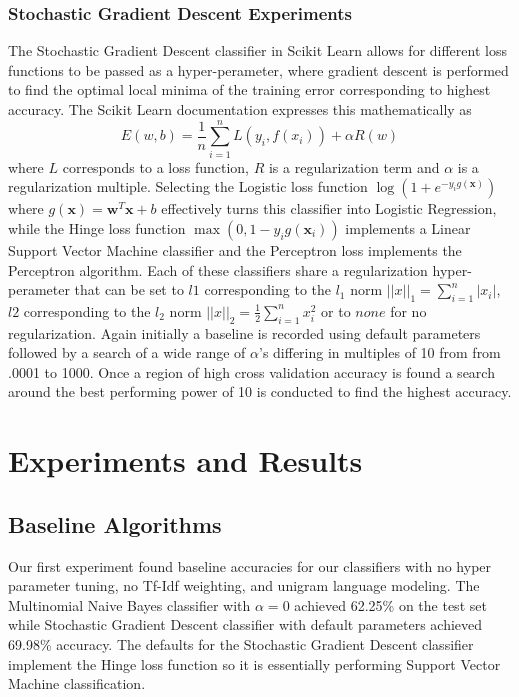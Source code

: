 \documentclass[a4paper, 12pt]{article}
\begin{document}
\subsubsection{Stochastic Gradient Descent Experiments}
The Stochastic Gradient Descent classifier in Scikit Learn allows for different loss functions to be passed as a hyper-perameter, where gradient descent is performed to find the optimal local minima of the training error corresponding to highest accuracy. The Scikit Learn documentation \cite{pedregosa2011scikit} expresses this mathematically as 
\[E(w,b)=\frac{1}{n}\sum_{i=1}^{n}L(y_i,f(x_i))+\alpha R(w)\]
where $L$ corresponds to a loss function, $R$ is a regularization term and $\alpha$ is a regularization multiple. Selecting the Logistic loss function $\log(1+e^{-y_ig(\bm{x})})$ where $g(\bm{x})=\bm{w}^T\bm{x}+b$ effectively turns this classifier into Logistic Regression, while the Hinge loss function  $\max(0, 1 - y_ig(\bm{x}_i))$ implements a Linear Support Vector Machine classifier and the Perceptron loss implements the Perceptron algorithm.  Each of these classifiers share a regularization hyper-perameter that can be set to $l1$ corresponding to the $l_1$ norm $||x||_1=\sum_{i=1}^n |x_i|$, $l2$ corresponding to the $l_2$ norm $||x||_2= \frac{1}{2} \sum_{i=1}^{n} x_i^2$ or to $none$ for no regularization. Again initially a baseline is recorded using default parameters followed by a search of a  wide range of $\alpha$'s differing in multiples of 10 from from .0001 to 1000. Once a region of high cross validation accuracy is found a search around the best performing power of 10 is conducted to find the highest accuracy.

\noindent
\section{Experiments and Results}
\subsection{Baseline Algorithms}
Our first experiment found baseline accuracies for our classifiers with no hyper parameter tuning, no Tf-Idf weighting, and unigram language modeling. The Multinomial Naive Bayes classifier with $\alpha=0$ achieved  62.25\% on the test set while Stochastic Gradient Descent classifier with default parameters achieved 69.98\% accuracy. The defaults for the Stochastic Gradient Descent classifier implement the Hinge loss function so it is essentially performing Support Vector Machine classification.
\end{document}
